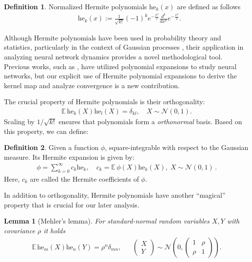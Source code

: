 \documentclass[twoside]{article}
\newcommand{\E}{\mathbb{E}\,}
\newcommand{\he}{\mathrm{he}}
\newtheorem{lemma}{Lemma}
\theoremstyle{definition}
\newtheorem{definition}{Definition}
\begin{document}
\begin{definition}
Normalized Hermite polynomials $\he_k(x)$ are defined as follows
\begin{align*}
&\he_k(x) :=\frac{1}{\sqrt{k!}}(-1)^k e^{-\frac{x^2}{2}} \frac{d^k}{dx^k} e^{-\frac{x^2}{2}}.
\end{align*}
\end{definition}

Although Hermite polynomials have been used in probability theory and statistics, particularly in the context of Gaussian processes \citep{williams2006gaussian}, their application in analyzing neural network dynamics provides a novel methodological tool. Previous works, such as \citet{daniely2016toward}, have utilized polynomial expansions to study neural networks, but our explicit use of Hermite polynomial expansions to derive the kernel map and analyze convergence is a new contribution.


The crucial property of Hermite polynomials is their  orthogonality:
\begin{align}\label{eq:hermite_orthogonality}
\E\he_k(X)\he_l(X) = \delta_{kl}, \quad X \sim \mathcal N(0,1).
\end{align}
Scaling by $1/\sqrt{k!}$ ensures that polynomials form a \emph{orthonormal} basis.  Based on this property, we can define:
\begin{definition}\label{def:hermite_expansion}
Given a function $\phi$, square-integrable with respect to the Gaussian measure. Its Hermite expansion is given by:
\begin{align*}
\phi = \sum_{k=0}^\infty c_k \he_k,\quad c_k = \E\phi(X) \he_k(X), \; X \sim \mathcal N (0,1)\,.
\end{align*}
Here, $c_k$ are called the Hermite coefficients of $\phi$. 
\end{definition}


In addition to orthogonality, Hermite polynomials have another ``magical'' property that is crucial for our later analysis. 

\begin{lemma}[Mehler's lemma]\label{lem:mehler_kernel}
For standard-normal random variables $X,Y$ with covariance $\rho$ it holds
\begin{align*}
\E\he_m(X)\he_n(Y) = \rho^n \delta_{mn}, && \begin{pmatrix}
    X \\ Y
\end{pmatrix}\sim \mathcal N\left(0, \begin{pmatrix} 1 & \rho \\ \rho & 1 \end{pmatrix}
 \right).
\end{align*}
\end{lemma}
\end{document}
